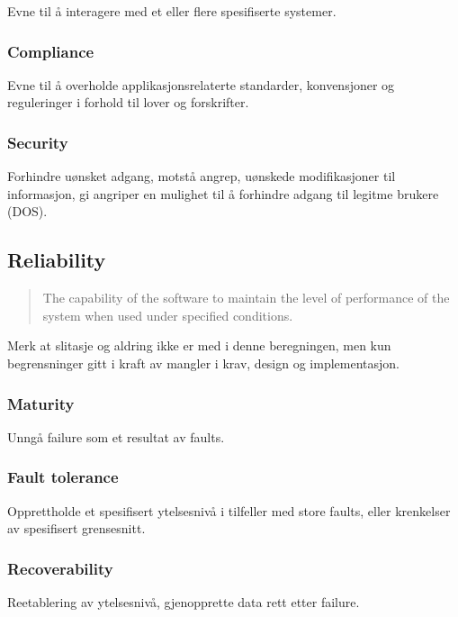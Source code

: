 Evne til å interagere med et eller flere spesifiserte systemer.

\subsubsection{Compliance}

Evne til å overholde applikasjonsrelaterte standarder, konvensjoner og
reguleringer i forhold til lover og forskrifter.

\subsubsection{Security}

Forhindre uønsket adgang, motstå angrep, uønskede modifikasjoner til
informasjon, gi angriper en mulighet til å forhindre adgang til legitme
brukere (DOS).

\subsection{Reliability}

\begin{quote}
The capability of the software to maintain the level of performance of
the system when used under specified conditions.

\end{quote}
Merk at slitasje og aldring ikke er med i denne beregningen, men kun
begrensninger gitt i kraft av mangler i krav, design og implementasjon.

\subsubsection{Maturity}

Unngå failure som et resultat av faults.

\subsubsection{Fault tolerance}

Opprettholde et spesifisert ytelsesnivå i tilfeller med store faults,
eller krenkelser av spesifisert grensesnitt.

\subsubsection{Recoverability}

Reetablering av ytelsesnivå, gjenopprette data rett etter failure.

